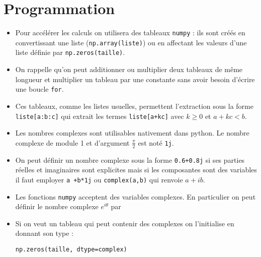 \section{Programmation}
\begin{itemize}
  \item Pour accélérer les calculs on utilisera des tableaux {\tt numpy} : ils sont créés en convertissant une liste ({\tt np.array(liste)}) ou en affectant les valeurs d'une liste définie par {\tt np.zeros(taille)}.

\item On rappelle qu'on peut additionner ou multiplier deux tableaux de même longueur et multiplier un tableau par une constante sans avoir besoin d'écrire une boucle {\tt for}.

\item Ces tableaux, comme les listes usuelles, permettent l'extraction sous la forme {\tt liste[a:b:c]} qui extrait les termes {\tt liste[a+kc]} avec $k\ge 0$ et $a+kc <b$.

\item Les nombres complexes sont utilisables nativement dans python. Le nombre complexe de module 1 et d'argument $\frac \pi2$ est noté {\tt 1j}.

\item On peut définir un nombre complexe sous la forme {\tt 0.6+0.8j} si ses parties réelles et imaginaires sont explicites mais si les composantes sont des variables il faut employer {\tt a +b*1j} ou {\tt complex(a,b)} qui renvoie $a+ib$.

\item Les fonctions {\tt numpy} acceptent des variables complexes. En particulier on peut définir le nombre complexe $e^{i\theta}$ par 

\item Si on veut un tableau qui peut contenir des complexes on l'initialise en donnant son type :
\begin{lstlisting}
np.zeros(taille, dtype=complex)
\end{lstlisting}
\end{itemize}
